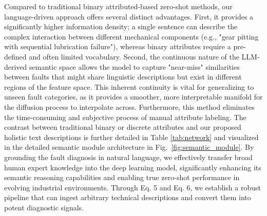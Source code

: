 Compared to traditional binary attributed-based zero-shot methods, our language-driven approach offers several distinct advantages. First, it provides a significantly higher information density; a single sentence can describe the complex interaction between different mechanical components (e.g., "gear pitting with sequential lubrication failure"), whereas binary attributes require a pre-defined and often limited vocabulary. Second, the continuous nature of the LLM-derived semantic space allows the model to capture "near-miss" similarities between faults that might share linguistic descriptions but exist in different regions of the feature space. This inherent continuity is vital for generalizing to unseen fault categories, as it provides a smoother, more interpretable manifold for the diffusion process to interpolate across. Furthermore, this method eliminates the time-consuming and subjective process of manual attribute labeling. The contrast between traditional binary or discrete attributes and our proposed holistic text descriptions is further detailed in Table \ref{tab:network} and visualized in the detailed semantic module architecture in Fig.~\ref{fig:semantic_module}. By grounding the fault diagnosis in natural language, we effectively transfer broad human expert knowledge into the deep learning model, significantly enhancing its semantic reasoning capabilities and enabling true zero-shot performance in evolving industrial environments. Through Eq. 5 and Eq. 6, we establish a robust pipeline that can ingest arbitrary technical descriptions and convert them into potent diagnostic signals.